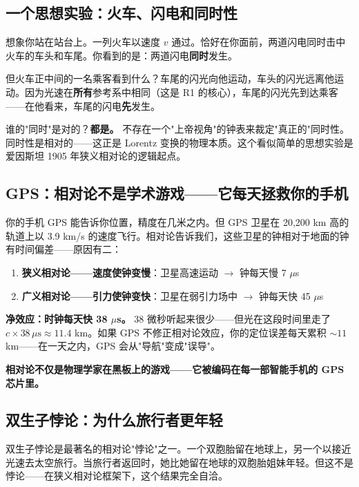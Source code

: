 \subsection{一个思想实验：火车、闪电和同时性}

想象你站在站台上。一列火车以速度 $v$ 通过。恰好在你面前，两道闪电同时击中火车的车头和车尾。你看到的是：两道闪电\textbf{同时}发生。

但火车正中间的一名乘客看到什么？车尾的闪光向他运动，车头的闪光远离他运动。因为光速在\textbf{所有}参考系中相同（这是 R1 的核心），车尾的闪光先到达乘客——在他看来，车尾的闪电\textbf{先}发生。

谁的"同时"是对的？\textbf{都是。} 不存在一个"上帝视角"的钟表来裁定"真正的"同时性。同时性是相对的——这正是 Lorentz 变换的物理本质。这个看似简单的思想实验是爱因斯坦 1905 年狭义相对论的逻辑起点。

\subsection{GPS：相对论不是学术游戏——它每天拯救你的手机}

你的手机 GPS 能告诉你位置，精度在几米之内。但 GPS 卫星在 20,200 km 高的轨道上以 3.9 km/s 的速度飞行。相对论告诉我们，这些卫星的钟相对于地面的钟有时间偏差——原因有二：

\begin{enumerate}
\item \textbf{狭义相对论——速度使钟变慢}：卫星高速运动 $\to$ 钟每天慢 7 $\mu$s
\item \textbf{广义相对论——引力使钟变快}：卫星在弱引力场中 $\to$ 钟每天快 45 $\mu$s
\end{enumerate}

\textbf{净效应：时钟每天快 38 $\mu$s。} 38 微秒听起来很少——但光在这段时间里走了 $c \times 38\,\mu\text{s} \approx 11.4$ km。如果 GPS 不修正相对论效应，你的定位误差每天累积 $\sim 11$ km——在一天之内，GPS 会从"导航"变成"误导"。

\textbf{相对论不仅是物理学家在黑板上的游戏——它被编码在每一部智能手机的 GPS 芯片里。}

\subsection{双生子悖论：为什么旅行者更年轻}

双生子悖论是最著名的相对论"悖论"之一。一个双胞胎留在地球上，另一个以接近光速去太空旅行。当旅行者返回时，她比她留在地球的双胞胎姐妹年轻。但这不是悖论——在狭义相对论框架下，这个结果完全自洽。

